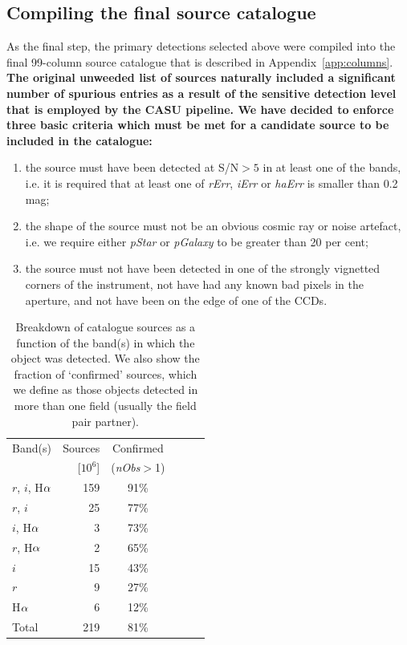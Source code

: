 \documentclass[a4paper,useAMS,usenatbib]{mn2e}
\def\ha{\mbox{H$\rm \alpha$}}
\begin{document}
\subsection{Compiling the final source catalogue}

As the final step, the primary detections
selected above were compiled
into the final 99-column source catalogue
that is described in Appendix~\ref{app:columns}.
{ \bf
The original unweeded list of sources naturally included 
a significant number of spurious entries
as a result of the sensitive detection level
that is employed by the CASU pipeline.
We have decided to enforce three basic criteria
which must be met for a candidate source
to be included in the catalogue:}
\begin{enumerate}
\item the source must have been detected at S/N$>5$ in at least
one of the bands, i.e. it is required that at least one of
\emph{rErr}, \emph{iErr} or \emph{haErr} is smaller
than 0.2 mag;
\item the shape of the source must not be an obvious
cosmic ray or noise artefact, i.e. we require
either \emph{pStar} or \emph{pGalaxy} to be
greater than 20 per cent;
\item the source must not have been detected
in one of the strongly vignetted corners of the instrument, 
not have had any known bad pixels in the aperture,
and not have been on the edge of one of the CCDs.
\end{enumerate}

\begin{table}
    \caption{Breakdown of catalogue sources as a function of the band(s)
             in which the object was detected.
             We also show the fraction of `confirmed' sources,
             which we define as those objects
             detected in more than one field
             (usually the field pair partner).}
    \label{tbl:detections}
    \begin{center}
        \begin{tabular}{lrcccc}
        \toprule
        Band(s) & Sources & Confirmed \\
        & [$10^6$] & (\emph{nObs}$>$1) \\
        \midrule
        $r$, $i$, \ha & 159 & 91\% \\
        $r$, $i$ & 25 & 77\% \\
        $i$, \ha & 3 & 73\% \\
        $r$, \ha & 2 & 65\% \\
        $i$ & 15 & 43\% \\
        $r$ & 9 & 27\% \\
        \ha & 6 & 12\% \\
        \midrule
        Total  & 219 & 81\% \\
        \bottomrule
        \end{tabular}
	\end{center}
\end{table}
\end{document}
